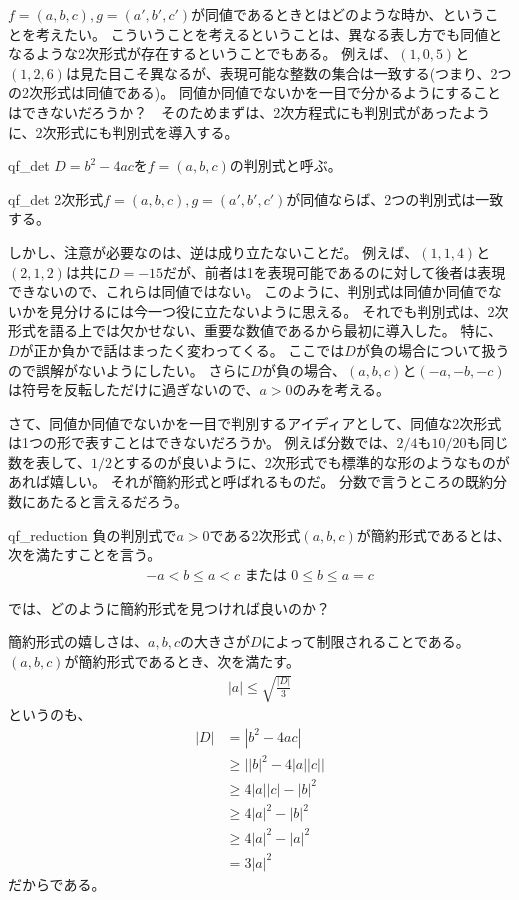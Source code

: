 $f=(a,b,c),g=(a',b',c')$が同値であるときとはどのような時か、ということを考えたい。
こういうことを考えるということは、異なる表し方でも同値となるような2次形式が存在するということでもある。
例えば、$(1,0,5)$と$(1,2,6)$は見た目こそ異なるが、表現可能な整数の集合は一致する(つまり、2つの2次形式は同値である)。
同値か同値でないかを一目で分かるようにすることはできないだろうか？　そのためまずは、2次方程式にも判別式があったように、2次形式にも判別式を導入する。

\begin{Defi}{}{qf_det}
$D=b^2-4ac$を$f=(a,b,c)$の判別式と呼ぶ。
\end{Defi}

\begin{Prop}{}{qf_det}
2次形式$f=(a,b,c),g=(a',b',c')$が同値ならば、2つの判別式は一致する。
\end{Prop}

しかし、注意が必要なのは、逆は成り立たないことだ。
例えば、$(1,1,4)$と$(2,1,2)$は共に$D=-15$だが、前者は1を表現可能であるのに対して後者は表現できないので、これらは同値ではない。
このように、判別式は同値か同値でないかを見分けるには今一つ役に立たないように思える。
それでも判別式は、2次形式を語る上では欠かせない、重要な数値であるから最初に導入した。
特に、$D$が正か負かで話はまったく変わってくる。
ここでは$D$が負の場合について扱うので誤解がないようにしたい。
さらに$D$が負の場合、$(a,b,c)$と$(-a,-b,-c)$は符号を反転しただけに過ぎないので、$a>0$のみを考える。

さて、同値か同値でないかを一目で判別するアイディアとして、同値な2次形式は1つの形で表すことはできないだろうか。
例えば分数では、$2/4$も$10/20$も同じ数を表して、$1/2$とするのが良いように、2次形式でも標準的な形のようなものがあれば嬉しい。
それが簡約形式と呼ばれるものだ。
分数で言うところの既約分数にあたると言えるだろう。

\begin{Defi}{}{qf_reduction}
負の判別式で$a>0$である2次形式$(a,b,c)$が簡約形式であるとは、次を満たすことを言う。
\begin{align*}
-a < b \le a < c \mbox{ または } 0 \le b \le a = c
\end{align*}
\end{Defi}

では、どのように簡約形式を見つければ良いのか？


簡約形式の嬉しさは、$a,b,c$の大きさが$D$によって制限されることである。
$(a,b,c)$が簡約形式であるとき、次を満たす。
\begin{align*}
|a| \le \sqrt{\frac{|D|}{3}}
\end{align*}
というのも、
\begin{align*}
|D| &= |b^2 - 4ac|\\
&\ge \big| |b|^2 - 4|a||c| \big|\\
&\ge 4|a||c| - |b|^2\\
&\ge 4|a|^2 - |b|^2\\
&\ge 4|a|^2 - |a|^2\\
&=3|a|^2
\end{align*}
だからである。

